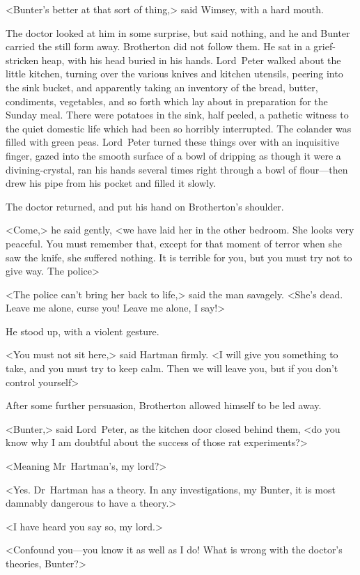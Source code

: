 <Bunter's better at that sort of thing,> said Wimsey, with a hard mouth.

The doctor looked at him in some surprise, but said nothing, and he and Bunter carried the still form away. Brotherton did not follow them. He sat in a grief-stricken heap, with his head buried in his hands. Lord~Peter walked about the little kitchen, turning over the various knives and kitchen utensils, peering into the sink bucket, and apparently taking an inventory of the bread, butter, condiments, vegetables, and so forth which lay about in preparation for the Sunday meal. There were potatoes in the sink, half peeled, a pathetic witness to the quiet domestic life which had been so horribly interrupted. The colander was filled with green peas. Lord~Peter turned these things over with an inquisitive finger, gazed into the smooth surface of a bowl of dripping as though it were a divining-crystal, ran his hands several times right through a bowl of flour—then drew his pipe from his pocket and filled it slowly.

The doctor returned, and put his hand on Brotherton's shoulder.

<Come,> he said gently, <we have laid her in the other bedroom. She looks very peaceful. You must remember that, except for that moment of terror when she saw the knife, she suffered nothing. It is terrible for you, but you must try not to give way. The police\longdash>

<The police can't bring her back to life,> said the man savagely. <She's dead. Leave me alone, curse you! Leave me alone, I say!>

He stood up, with a violent gesture.

<You must not sit here,> said Hartman firmly. <I will give you something to take, and you must try to keep calm. Then we will leave you, but if you don't control yourself\longdash>

After some further persuasion, Brotherton allowed himself to be led away.

<Bunter,> said Lord~Peter, as the kitchen door closed behind them, <do you know why I am doubtful about the success of those rat experiments?>

<Meaning Mr~Hartman's, my lord?>

<Yes. Dr~Hartman has a theory. In any investigations, my Bunter, it is most damnably dangerous to have a theory.>

<I have heard you say so, my lord.>

<Confound you—you know it as well as I do! What is wrong with the doctor's theories, Bunter?>

